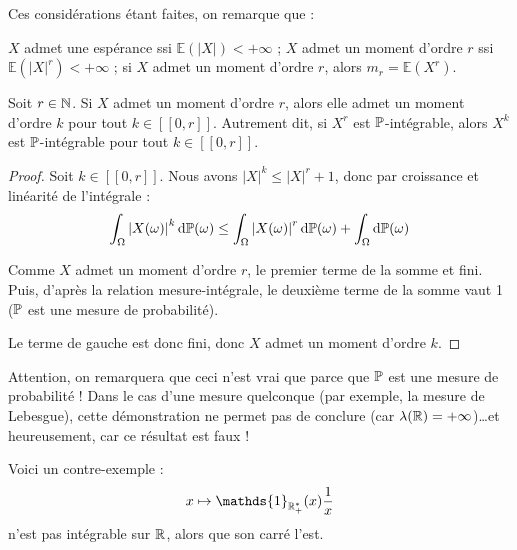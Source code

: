 \documentclass[../integ-proba.tex]{subfiles}
\begin{document}
    \begin{rem}
        Ces considérations étant faites, on remarque que :
        \begin{itemize}
            \itemb $X$ admet une espérance ssi $\mathbb{E}(\left| X \right|) < +\infty$ ;
            \itemb $X$ admet un moment d'ordre $r$ ssi $\mathbb{E}(\left| X \right|^r) < +\infty$ ;
            \itemb si $X$ admet un moment d'ordre $r$, alors $m_r = \mathbb{E}(X^r)$.
        \end{itemize}
    \end{rem}

    \begin{prop}
        \label{prop:moments_cascade}
        Soit $r\in\mathbb{N}$.
        Si $X$ admet un moment d'ordre $r$, alors elle admet un moment d'ordre $k$ pour tout $k\in[\![0,r]\!]$.
        Autrement dit, si $X^r$ est $\mathbb{P}$-intégrable, alors $X^k$ est $\mathbb{P}$-intégrable pour tout $k\in[\![0,r]\!]$.
    \end{prop}

    \begin{proof}
        Soit $k\in[\![0,r]\!]$.
        Nous avons $\left|X\right|^k \leq \left|X\right|^r+1$, donc par croissance et linéarité de l'intégrale :
        \begin{displaymath}
            \int_\Omega \left|X(\omega)\right|^k \text{d}\mathbb{P}(\omega) \leq \int_\Omega \left|X(\omega)\right|^r \text{d}\mathbb{P}(\omega) + \int_\Omega \text{d}\mathbb{P}(\omega)
        \end{displaymath}

        Comme $X$ admet un moment d'ordre $r$, le premier terme de la somme et fini.
        Puis, d'après la relation mesure-intégrale, le deuxième terme de la somme vaut 1 ($\mathbb{P}$ est une mesure de probabilité).

        Le terme de gauche est donc fini, donc $X$ admet un moment d'ordre $k$.
    \end{proof}

    \begin{rem}
        \label{rem:warning_moments}
        Attention, on remarquera que ceci n'est vrai que parce que $\mathbb{P}$ est une mesure de probabilité !
        Dans le cas d'une mesure quelconque (par exemple, la mesure de Lebesgue), cette démonstration ne permet pas de conclure (car $\lambda(\mathbb{R}) = +\infty$)\ldots et heureusement, car ce résultat est faux !

        Voici un contre-exemple :
        \begin{displaymath}
          x \mapsto \mathds{1}_{\R_+^*}(x)\frac{1}{x}
        \end{displaymath}
        n'est pas intégrable sur $\mathbb{R}$, alors que son carré l'est.
    \end{rem}
\end{document}
